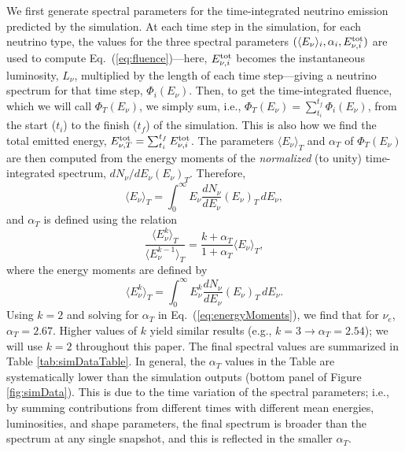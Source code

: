 \documentclass[aps,reprint,superscriptaddress]{revtex4-1}
\begin{document}
We first generate spectral parameters for the time-integrated neutrino emission predicted by the simulation. At each time step in the simulation, for each neutrino type, the values for the three spectral parameters $(\langle E_{\nu}\rangle_i, \alpha_i, E_{\nu,i}^{\rm tot})$ are used to compute Eq.~(\ref{eq:fluence})---here, $E_{\nu,i}^{\rm tot}$ becomes the instantaneous luminosity, $L_{\nu}$, multiplied by the length of each time step---giving a neutrino spectrum for that time step, $\Phi_{i}(E_{\nu})$. Then, to get the time-integrated fluence, which we will call $\Phi_{T}(E_{\nu})$, we simply sum, i.e., $\Phi_{T}(E_{\nu})=\sum_{t_{i}}^{t_{f}}\Phi_{i}(E_{\nu})$, from the start ($t_i$) to the finish ($t_f$) of the simulation. This is also how we find the total emitted energy, $E_{\nu,T}^{\rm tot}=\sum_{t_{i}}^{t_{f}}E_{\nu,i}^{\rm tot}$. The parameters $\langle E_{\nu}\rangle_T$ and $\alpha_T$ of $\Phi_{T}(E_{\nu})$ are then computed from the energy moments of the \textit{normalized} (to unity) time-integrated spectrum, $dN_\nu/dE_\nu(E_{\nu})_T$. Therefore, 
\begin{equation} 
\langle {E}_{\nu}\rangle_T=\int_{0}^{\infty} E_{\nu} \frac{dN_\nu}{dE_\nu}(E_{\nu})_T \,d E_{\nu},
\end{equation}
and $\alpha_T$ is defined using the relation \cite{Tamborra:2012ac,Keil:2002in}
\begin{equation} \label{eq:energyMoments}
\frac{\langle E_{\nu}^{k}\rangle_T}{\langle E_{\nu}^{k-1}\rangle_T}=\frac{k+\alpha_T}{1+\alpha_T}\langle E_{\nu}\rangle_T,
\end{equation}
where the energy moments are defined by
\begin{equation} 
\langle E_{\nu}^{k}\rangle_T=\int_{0}^{\infty} E_{\nu}^{k} \frac{dN_\nu}{dE_\nu}(E_{\nu})_T \,d E_{\nu}.
\end{equation}
Using $k=2$ and solving for $\alpha_T$ in Eq.~(\ref{eq:energyMoments}), we find that for $\nu_{e}$, $\alpha_T=2.67$. Higher values of $k$ yield similar results (e.g., $k=3 \rightarrow \alpha_T=2.54$); we will use $k=2$ throughout this paper. The final spectral values are summarized in Table \ref{tab:simDataTable}. In general, the $\alpha_T$ values in the Table are systematically lower than the simulation outputs (bottom panel of Figure \ref{fig:simData}). This is due to the time variation of the spectral parameters; i.e., by summing contributions from different times with different mean energies, luminosities, and shape parameters, the final spectrum is broader than the spectrum at any single snapshot, and this is reflected in the smaller $\alpha_T$. 
\end{document}
